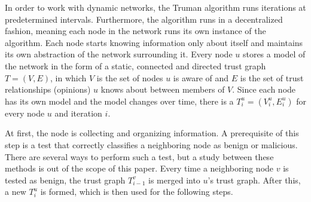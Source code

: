 \documentclass[conference]{IEEEtran}
\begin{document}

In order to work with dynamic networks, the Truman algorithm runs iterations at predetermined intervals.
Furthermore, the algorithm runs in a decentralized fashion, meaning each node in the network runs its own instance of the algorithm.
Each node starts knowing information only about itself and maintains its own abstraction of the network surrounding it.
Every node $u$ stores a model of the network in the form of a static, connected and directed trust graph $T = (V, E)$, in which $V$ is the set of nodes $u$ is aware of and $E$ is the set of trust relationships (opinions) $u$ knows about between members of $V$.
Since each node has its own model and the model changes over time, there is a $T^u_i = (V^u_i, E^u_i)$ for every node $u$ and iteration $i$.



At first, the node is collecting and organizing information.
A prerequisite of this step is a test that correctly classifies a neighboring node as benign or malicious.
There are several ways to perform such a test, but a study between these methods is out of the scope of this paper.
Every time a neighboring node $v$ is tested as benign, the trust graph $T^v_{i-1}$ is merged into $u$'s trust graph.
After this, a new $T^u_i$ is formed, which is then used for the following steps.

\end{document}
